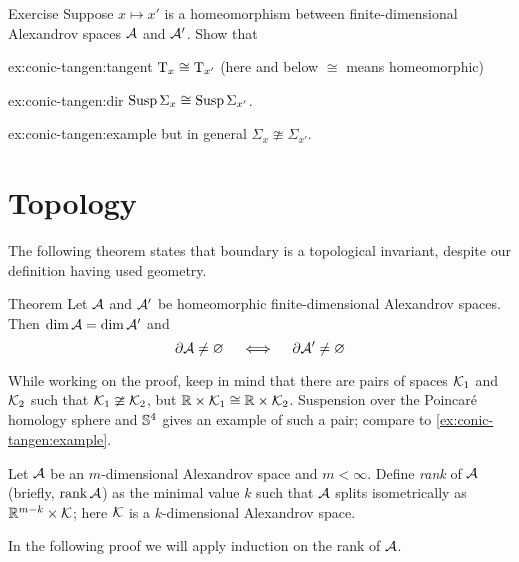 \begin{thm}{Exercise}\label{ex:conic-tangent}
Suppose $x\mapsto x'$ is a homeomorphism between finite-dimensional Alexandrov spaces $\mathcal{A}$ and $\mathcal{A}'$. Show that 

\begin{subthm}{ex:conic-tangen:tangent}
$\mathrm{T}_x\cong \mathrm{T}_{x'}$ (here and below $\cong $ means homeomorphic) 
\end{subthm}

\begin{subthm}{ex:conic-tangen:dir}
$\mathop{\rm Susp}\nolimits\Sigma_x\cong \mathop{\rm Susp}\nolimits\Sigma_{x'}$.
\end{subthm}

\begin{subthm}{ex:conic-tangen:example}
but in general $\Sigma_x\ncong\Sigma_{x'}$.
\end{subthm}

\end{thm}



\section{Topology}

The following theorem states that boundary is a topological invariant, despite our definition having used geometry.

\begin{thm}{Theorem}\label{thm:top-bry}
Let $\mathcal{A}$ and $\mathcal{A}'$ be homeomorphic finite-dimensional Alexandrov spaces.
Then $\operatorname{\rm dim}\nolimits \mathcal{A}=\operatorname{\rm dim}\nolimits\mathcal{A}'$ and
\[\partial\mathcal{A}\ne \varnothing
\quad\iff\quad
\partial\mathcal{A}'\ne \varnothing
\]
\end{thm}

While working on the proof, keep in mind that there are pairs of spaces $\mathcal{K}_1$ and $\mathcal{K}_2$ such that $\mathcal{K}_1\ncong \mathcal{K}_2$, but $\mathbb{R}\times \mathcal{K}_1\cong \mathbb{R}\times \mathcal{K}_2$.
Suspension over the Poincaré homology sphere and $\mathbb{S}^4$ gives an example of such a pair; compare to \ref{ex:conic-tangen:example}.

Let $\mathcal{A}$ be an $m$-dimensional Alexandrov space and $m<\infty$.
Define \emph{rank} of $\mathcal{A}$ (briefly, $\operatorname{\rm rank}\nolimits\mathcal{A}$) as the minimal value $k$ such that $\mathcal{A}$ splits isometrically as $\mathbb{R}^{m-k}\times \mathcal{K}$;
here $\mathcal{K}$ is a $k$-dimensional Alexandrov space.

In the following proof we will apply induction on the rank of $\mathcal{A}$.


